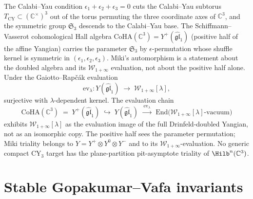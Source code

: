 \begin{remark}
\label{rem:miki-triality-on-coha}
The Calabi--Yau condition $\epsilon_1 + \epsilon_2 + \epsilon_3 = 0$ cuts the Calabi--Yau subtorus $T_{\mathrm{CY}} \subset (\mathbb{C}^\times)^3$ out of the torus permuting the three coordinate axes of $\mathbb{C}^3$, and the symmetric group $\mathfrak{S}_3$ descends to the Calabi--Yau base. The Schiffmann--Vasserot cohomological Hall algebra $\mathrm{CoHA}(\mathbb{C}^3) = Y^+(\widehat{\mathfrak{gl}}_1)$ (positive half of the affine Yangian) carries the parameter $\mathfrak{S}_3$ by $\epsilon$-permutation whose shuffle kernel is symmetric in $(\epsilon_1, \epsilon_2, \epsilon_3)$. Miki's automorphism is a statement about the doubled algebra and its $\mathcal{W}_{1+\infty}$ evaluation, not about the positive half alone. Under the Gaiotto--Rap\v{c}\'ak evaluation
\[
 \mathrm{ev}_\lambda \colon Y(\widehat{\mathfrak{gl}}_1) \;\longrightarrow\; \mathcal{W}_{1+\infty}[\lambda],
\]
surjective with $\lambda$-dependent kernel. The evaluation chain
\[
 \mathrm{CoHA}(\mathbb{C}^3) \;=\; Y^+(\widehat{\mathfrak{gl}}_1)
 \;\hookrightarrow\; Y(\widehat{\mathfrak{gl}}_1)
 \;\xrightarrow{\;\mathrm{ev}_\lambda\;}\;
 \mathrm{End}\bigl(\mathcal{W}_{1+\infty}[\lambda]\text{-vacuum}\bigr)
\]
exhibits $\mathcal{W}_{1+\infty}[\lambda]$ as the evaluation image of the full Drinfeld-doubled Yangian, not as an isomorphic copy. The positive half sees the parameter permutation; Miki triality belongs to \(Y=Y^+\otimes Y^0\otimes Y^-\) and to its \(\mathcal W_{1+\infty}\)-evaluation. No generic compact CY$_3$ target has the plane-partition pit-asymptote triality of \(\Hilb^n(\mathbb C^3)\).
\end{remark}

\section{Stable Gopakumar--Vafa invariants}
\label{sec:stable-gopakumar-vafa}

